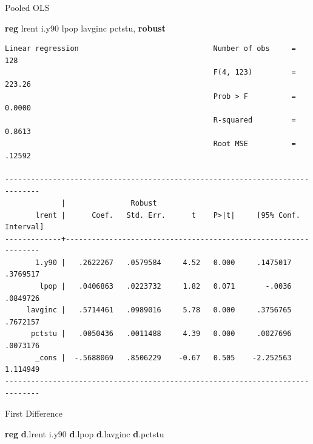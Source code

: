 \documentclass[
]{book}
\newenvironment{Shaded}{\begin{snugshade}}{\end{snugshade}}
\newcommand{\KeywordTok}[1]{\textcolor[rgb]{0.13,0.29,0.53}{\textbf{#1}}}
\newcommand{\NormalTok}[1]{#1}
\begin{document}
Pooled OLS

\begin{Shaded}
\begin{Highlighting}[]
\KeywordTok{reg}\NormalTok{ lrent i.y90 lpop lavginc pctstu, }\KeywordTok{robust}
\end{Highlighting}
\end{Shaded}

\begin{verbatim}
Linear regression                               Number of obs     =        128
                                                F(4, 123)         =     223.26
                                                Prob > F          =     0.0000
                                                R-squared         =     0.8613
                                                Root MSE          =     .12592

------------------------------------------------------------------------------
             |               Robust
       lrent |      Coef.   Std. Err.      t    P>|t|     [95% Conf. Interval]
-------------+----------------------------------------------------------------
       1.y90 |   .2622267   .0579584     4.52   0.000     .1475017    .3769517
        lpop |   .0406863   .0223732     1.82   0.071       -.0036    .0849726
     lavginc |   .5714461   .0989016     5.78   0.000     .3756765    .7672157
      pctstu |   .0050436   .0011488     4.39   0.000     .0027696    .0073176
       _cons |  -.5688069   .8506229    -0.67   0.505    -2.252563    1.114949
------------------------------------------------------------------------------
\end{verbatim}

First Difference

\begin{Shaded}
\begin{Highlighting}[]
\KeywordTok{reg} \KeywordTok{d}\NormalTok{.lrent i.y90 }\KeywordTok{d}\NormalTok{.lpop }\KeywordTok{d}\NormalTok{.lavginc }\KeywordTok{d}\NormalTok{.pctstu}
\end{Highlighting}
\end{Shaded}
\end{document}
